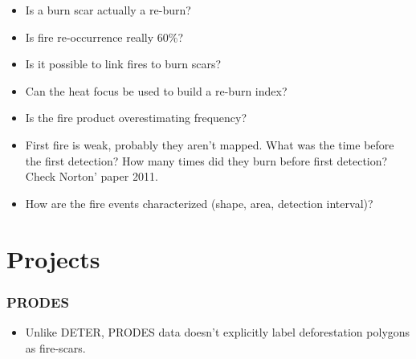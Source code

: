 \documentclass{beamer}
\begin{document}
\begin{frame}[t, allowframebreaks]
\begin{itemize}
\begin{itemize}
            \item Is a burn scar actually a re-burn?
            \item Is fire re-occurrence really 60\%?
            \item Is it possible to link fires to burn scars?
            \item Can the heat focus be used to build a re-burn index?
            \item Is the fire product overestimating frequency?
            \item First fire is weak, probably they aren't mapped. What was the 
                time before the first detection? How many times did they burn 
                before first detection? Check Norton' paper 2011.
            \item How are the fire events characterized (shape, area, 
                detection interval)?
        \end{itemize}
    \end{itemize}
\end{frame}



\section{Projects}

\begin{frame}[t, allowframebreaks]
    \frametitle{PRODES}
    \begin{itemize}
        \item Unlike DETER, PRODES data doesn't explicitly label deforestation
            polygons as fire-scars.
    \end{itemize}
\end{frame}
\end{document}
